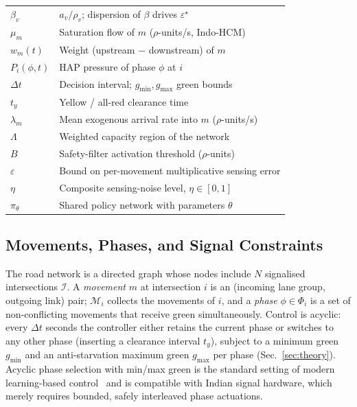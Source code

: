 \documentclass[journal]{IEEEtran}
\newcommand{\Mset}{\mathcal{M}}
\begin{document}
\begin{table}[htbp]
\begin{tabularx}{\columnwidth}{@{}lX@{}}
$\beta_v$          & $a_v/\rho_v$; dispersion of $\beta$ drives $\varepsilon^\star$ \\
$\mu_m$            & Saturation flow of $m$ ($\rho$-units/s, Indo-HCM) \\
$w_m(t)$           & Weight (upstream $-$ downstream) of $m$ \\
$P_i(\phi,t)$      & HAP pressure of phase $\phi$ at $i$ \\
$\Delta t$         & Decision interval; $g_{\min},g_{\max}$ green bounds \\
$t_y$              & Yellow / all-red clearance time \\
$\lambda_m$        & Mean exogenous arrival rate into $m$ ($\rho$-units/s) \\
$\Lambda$          & Weighted capacity region of the network \\
$B$                & Safety-filter activation threshold ($\rho$-units) \\
$\varepsilon$      & Bound on per-movement multiplicative sensing error \\
$\eta$             & Composite sensing-noise level, $\eta \in [0,1]$ \\
$\pi_\theta$       & Shared policy network with parameters $\theta$ \\
\bottomrule
\end{tabularx}
\end{table}

\subsection{Movements, Phases, and Signal Constraints}
The road network is a directed graph whose nodes include $N$ signalised
intersections $\mathcal{I}$. A \emph{movement} $m$ at intersection $i$ is
an (incoming lane group, outgoing link) pair; $\Mset_i$ collects the
movements of $i$, and a \emph{phase} $\phi \in \Phi_i$ is a set of
non-conflicting movements that receive green simultaneously. Control is
acyclic: every $\Delta t$ seconds the controller either retains the
current phase or switches to any other phase (inserting a clearance
interval $t_y$), subject to a minimum green $g_{\min}$ and an
anti-starvation maximum green $g_{\max}$ per phase
(Sec.~\ref{sec:theory}). Acyclic phase selection with min/max green is
the standard setting of modern learning-based
control~\cite{b_mplight,b_advxlight} and is compatible with Indian signal
hardware, which merely requires bounded, safely interleaved phase
actuations.
\end{document}
